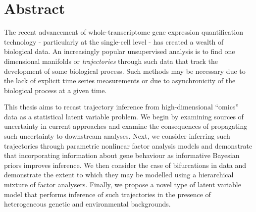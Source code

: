 \begingroup
\let\clearpage\relax
\let\cleardoublepage\relax
\let\cleardoublepage\relax

\chapter*{Abstract}

The recent advancement of whole-transcriptome gene expression quantification technology - particularly at the single-cell level - has created a wealth of biological data. An increasingly popular unsupervised analysis is to find one dimensional manifolds or \emph{trajectories} through such data that track the development of some biological process. Such methods may be necessary due to the lack of explicit time series measurements or due to asynchronicity of the biological process at a given time. 

This thesis aims to recast trajectory inference from high-dimensional ``omics'' data as a statistical latent variable problem. We begin by examining sources of uncertainty in current approaches and examine the consequences of propagating such uncertainty to downstream analyses. Next, we consider inferring such trajectories through parametric nonlinear factor analysis models and demonstrate that incorporating information about gene behaviour as informative Bayesian priors improves inference. We then consider the case of bifurcations in data and demonstrate the extent to which they may be modelled using a hierarchical mixture of factor analysers. Finally, we propose a novel type of latent variable model that performs inference of such trajectories in the presence of heterogeneous genetic and environmental backgrounds.

\endgroup
\vfill